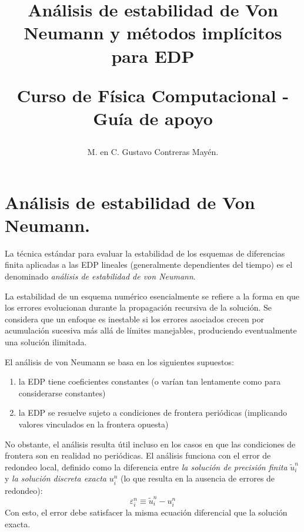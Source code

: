 

\title{Análisis de estabilidad de Von Neumann y métodos implícitos para EDP \\ \begin{Large}Curso de Física Computacional - Guía de apoyo \end{Large}}
\author{M. en C. Gustavo Contreras Mayén.}
%

\fontsize{14}{14}\selectfont
\maketitle
\section{Análisis de estabilidad de Von Neumann.}
La técnica estándar para evaluar la estabilidad de los esquemas de diferencias finita aplicadas a las EDP lineales (generalmente dependientes del tiempo) es el denominado \emph{análisis de estabilidad de von Neumann}.
\par
La estabilidad de un esquema numérico esencialmente se refiere a la forma en que los errores evolucionan durante la propagación recursiva de la solución. Se considera que un enfoque es inestable si los errores asociados crecen por acumulación sucesiva más allá de límites manejables, produciendo eventualmente una solución ilimitada.
\par
El análisis de von Neumann se basa en los siguientes supuestos:
\begin{enumerate}
\item la EDP tiene coeficientes constantes (o varían tan lentamente como para considerarse constantes)
\item la EDP se resuelve sujeto a condiciones de frontera periódicas (implicando valores vinculados en la frontera opuesta)
\end{enumerate}
No obstante, el análisis resulta útil incluso en los casos en que las condiciones de frontera son en realidad no periódicas. El análisis funciona con el error de redondeo local, definido como la diferencia entre \emph{la solución de precisión finita} $\tilde{u}_{i}^{n}$ y \emph{la solución discreta exacta} $u_{i}^{n}$ (lo que resulta en la ausencia de errores de redondeo):
\begin{equation}
\varepsilon_{i}^{n} \equiv \tilde{u}_{i}^{n} - u_{i}^{n}
\label{eq:ecuacion_13_55}
\end{equation}
Con esto, el error debe satisfacer la misma ecuación diferencial que la solución exacta.
